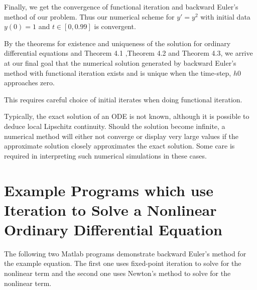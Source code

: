 Finally, we get the convergence of functional iteration and backward Euler's method of our problem. Thus our numerical scheme for $y'=y^{2}$ with initial data $y(0)=1$ and $t\in[0,0.99]$ is convergent.

\begin{corollary}
By the theorems for existence and uniqueness of the solution for ordinary differential equations and Theorem 4.1 ,Theorem 4.2 and Theorem 4.3, we arrive at our final goal that the numerical solution generated by backward Euler's method with functional iteration exists and is unique when the time-step, $h0$ approaches zero.
\end{corollary}
 
\begin{remark} This requires careful choice of initial iterates when doing functional iteration.
\end{remark}

\begin{remark} Typically, the exact solution of an ODE is not known, although it is possible to deduce local Lipschitz continuity. Should the solution become infinite, a numerical method will either not converge or display very large values if the approximate solution closely approximates the exact solution. Some care is required in interpreting such numerical simulations in these cases.
\end{remark}
\section{Example Programs which use Iteration to Solve a Nonlinear Ordinary Differential Equation}

The following two Matlab programs demonstrate backward Euler's method for the example equation. The first one uses fixed-point iteration to solve for the nonlinear term and the second one uses Newton's method to solve for the nonlinear term. 




